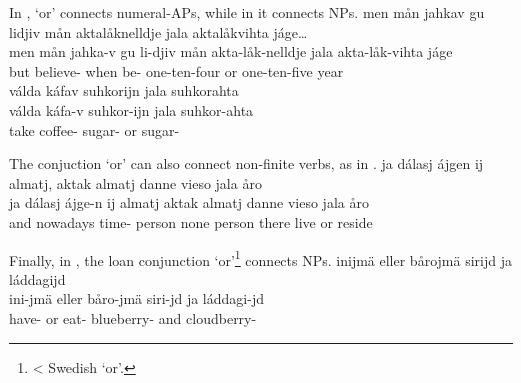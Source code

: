 In ,  ‘or’ connects numeral-APs, while in  it connects NPs. 
\ea\label{conjunctionEx3}%
\glll	men mån jahkav gu lidjiv mån aktalåknelldje jala aktalåkvihta jáge…\\
	men mån jahka-v gu li-djiv mån akta-låk-nelldje jala akta-låk-vihta jáge\\
	but  believe- when be-  one-ten-four or one-ten-five year\BS{}\\\nopagebreak
{}	
\z
\ea\label{conjunctionEx4}%
\glll	válda káfav suhkorijn jala suhkorahta\\
	válda káfa-v suhkor-ijn jala suhkor-ahta\\
	take\BS{} coffee- sugar- or sugar-\\\nopagebreak
{}	
\z

The conjuction  ‘or’ can also connect non-finite verbs, as in . 
\ea\label{conjunctionEx5}%
\glll	ja dálasj ájgen ij almatj, aktak almatj danne vieso jala åro\\
	ja dálasj ájge-n ij almatj aktak almatj danne vieso jala åro\\
	and nowadays time- \BS{} person\BS{} none person\BS{} there live\BS{} or reside\BS{}\\\nopagebreak
{}	
\z

Finally, in , the loan conjunction  ‘or’\footnote{< Swedish  ‘or’.} connects NPs. 
\ea\label{conjunctionEx6}%
\glll	inijmä eller bårojmä sirijd ja láddagijd\\
	ini-jmä eller båro-jmä siri-jd ja láddagi-jd\\
	have- or eat- blueberry- and cloudberry-\\\nopagebreak
{}	
\z


